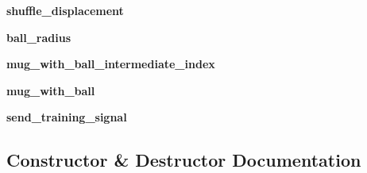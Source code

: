 \begin{DoxyCompactItemize}
\item 
{\bfseries shuffle\+\_\+displacement}\hypertarget{classthimblerigger_1_1Thimblerigger_a82156fb2f87051aa557e849009fa3726}{}\label{classthimblerigger_1_1Thimblerigger_a82156fb2f87051aa557e849009fa3726}

\item 
{\bfseries ball\+\_\+radius}\hypertarget{classthimblerigger_1_1Thimblerigger_a78d0df2afc03a5b6286715d9e386f1f8}{}\label{classthimblerigger_1_1Thimblerigger_a78d0df2afc03a5b6286715d9e386f1f8}

\item 
{\bfseries mug\+\_\+with\+\_\+ball\+\_\+intermediate\+\_\+index}\hypertarget{classthimblerigger_1_1Thimblerigger_ab7b7fe3d00cc03647329282ed765456c}{}\label{classthimblerigger_1_1Thimblerigger_ab7b7fe3d00cc03647329282ed765456c}

\item 
{\bfseries mug\+\_\+with\+\_\+ball}\hypertarget{classthimblerigger_1_1Thimblerigger_a9fec172e829583bfe6c1f31c719b933d}{}\label{classthimblerigger_1_1Thimblerigger_a9fec172e829583bfe6c1f31c719b933d}

\item 
{\bfseries send\+\_\+training\+\_\+signal}\hypertarget{classthimblerigger_1_1Thimblerigger_ac83105705969ba7f738050440c3777fc}{}\label{classthimblerigger_1_1Thimblerigger_ac83105705969ba7f738050440c3777fc}

\end{DoxyCompactItemize}


\subsection{Constructor \& Destructor Documentation}
